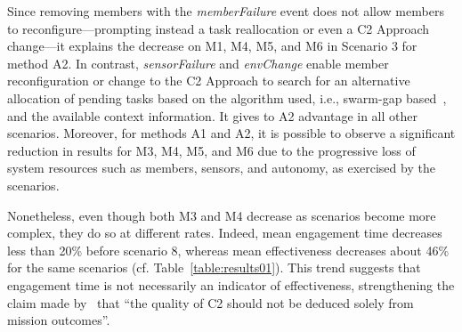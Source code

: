 Since removing members with the \emph{memberFailure} event does not allow members to reconfigure---prompting instead a task reallocation or even a C2 Approach change---it explains the decrease on M1, M4, M5, and M6 in Scenario 3 for method A2. \color{black}In contrast, \emph{sensorFailure} and \emph{envChange} enable member reconfiguration or change to the C2 Approach to search for an alternative allocation of pending tasks based on the algorithm used, i.e., swarm-gap based~\citep{MAS07, UAV01}, and the available context information. \color{black}It gives to A2 advantage in all other scenarios. Moreover, for methods A1 and A2, it is possible to observe a significant reduction in results for M3, M4, M5, and M6 due to the progressive loss of  system resources such as  members, sensors, and autonomy, as exercised by the scenarios. 




%
\color{black}
Nonetheless, even though both M3 and M4 decrease as scenarios become more complex, they do so at different rates.
Indeed, mean engagement time decreases less than 20\% before scenario 8, whereas mean effectiveness decreases about 46\% for the same scenarios (cf. Table~\ref{table:results01}).
This trend suggests that engagement time is not necessarily an indicator of effectiveness, strengthening the claim made by~\citet{Alberts2006} that ``the quality of C2 should not be deduced solely from mission outcomes''.
\color{black}


